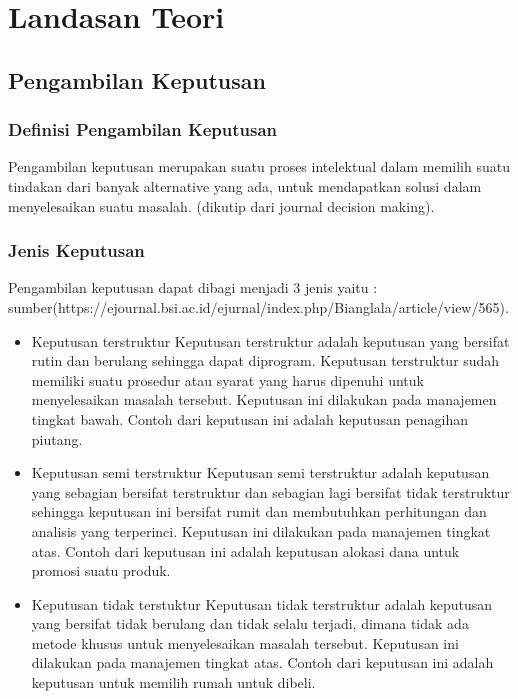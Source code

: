 \chapter{Landasan Teori}
\label{chap:teori}

\section{Pengambilan Keputusan}
\subsection{Definisi Pengambilan Keputusan}
Pengambilan keputusan merupakan suatu proses intelektual dalam memilih suatu tindakan dari banyak alternative yang ada, untuk mendapatkan solusi dalam menyelesaikan suatu masalah. (dikutip dari journal decision making).

\subsection{Jenis Keputusan} 
Pengambilan keputusan dapat dibagi menjadi 3 jenis yaitu :  sumber(https://ejournal.bsi.ac.id/ejurnal/index.php/Bianglala/article/view/565).
\begin{itemize}
	\item Keputusan terstruktur
Keputusan terstruktur adalah keputusan yang bersifat rutin dan berulang sehingga dapat diprogram. Keputusan terstruktur sudah memiliki suatu prosedur atau syarat yang harus dipenuhi untuk menyelesaikan masalah tersebut. Keputusan ini  dilakukan pada manajemen tingkat bawah. Contoh dari keputusan ini adalah keputusan penagihan piutang.
	
	\item Keputusan semi terstruktur
Keputusan semi terstruktur adalah keputusan yang sebagian bersifat terstruktur dan sebagian lagi bersifat tidak terstruktur sehingga keputusan ini bersifat rumit dan membutuhkan perhitungan dan analisis yang terperinci. Keputusan ini dilakukan pada manajemen tingkat atas. Contoh dari keputusan ini adalah keputusan alokasi dana untuk promosi suatu produk. 

	\item Keputusan tidak terstuktur
Keputusan tidak terstruktur adalah keputusan yang bersifat tidak berulang dan tidak selalu terjadi, dimana tidak ada metode khusus untuk menyelesaikan masalah tersebut. Keputusan ini dilakukan pada manajemen tingkat atas. Contoh dari keputusan ini adalah keputusan untuk memilih rumah untuk dibeli.
\end{itemize}

